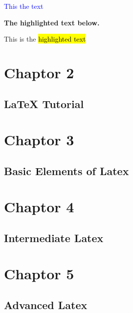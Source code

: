 \documentclass[12pt]{book}
\begin{document}
\textcolor{blue}{This the text} \\  


\begin{center}
\textbf{\color{blue}The highlighted text below.}

\end{center}
 This is the \hl{highlighted text}

\section{Chaptor 2}

\subsection{LaTeX Tutorial}

\section{Chaptor 3}

\subsection{Basic Elements of Latex }

\section{Chaptor 4}

\subsection{Intermediate Latex }

\section{Chaptor 5}

\subsection{Advanced Latex }
\end{document}
